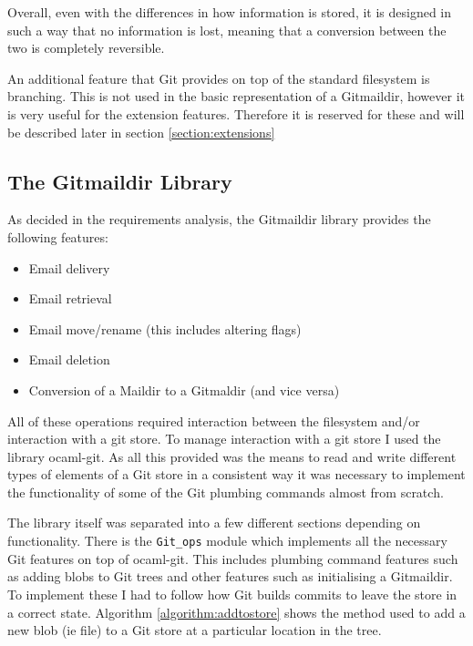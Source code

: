 Overall, even with the differences in how information is stored, it is designed in such a way that no information is lost, meaning that a conversion between the two is completely reversible.

An additional feature that Git provides on top of the standard filesystem is branching. This is not used in the basic representation of a Gitmaildir, however it is very useful for the extension features. Therefore it is reserved for these and will be described later in section \ref{section:extensions}

\subsection{The Gitmaildir Library}

As decided in the requirements analysis, the Gitmaildir library provides the following features:

\begin{itemize}
\item Email delivery
\item Email retrieval
\item Email move/rename (this includes altering flags)
\item Email deletion
\item Conversion of a Maildir to a Gitmaldir (and vice versa)
\end{itemize}

All of these operations required interaction between the filesystem and/or interaction with a git store. To manage interaction with a git store I used the library ocaml-git. As all this provided was the means to read and write different types of elements of a Git store in a consistent way it was necessary to implement the functionality of some of the Git plumbing commands almost from scratch.

The library itself was separated into a few different sections depending on functionality. There is the \texttt{Git\_ops} module which implements all the necessary Git features on top of ocaml-git. This includes plumbing command features such as adding blobs to Git trees and other features such as initialising a Gitmaildir. To implement these I had to follow how Git builds commits to leave the store in a correct state. Algorithm \ref{algorithm:addtostore} shows the method used to add a new blob (ie file) to a Git store at a particular location in the tree.

